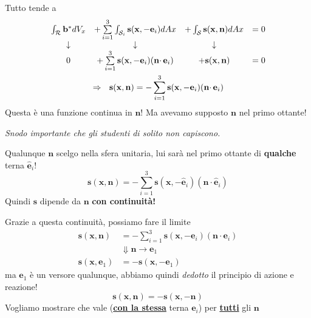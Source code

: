 \documentclass[10pt,a4paper,twoside]{book}
\begin{document}
Tutto tende a
\begin{gather*}
\begin{array}{ c c c c }
\int _{\mathcal{R}}\mathbf{b}^{*} dV_{x} & +\sum\limits ^{3}_{i=1}\int _{\mathcal{S}_{i}}\mathbf{s}(\mathbf{x} ,-\mathbf{e}_{i}) dAx & +\int _{\mathcal{S}}\mathbf{s}(\mathbf{x} ,\mathbf{n}) dAx & =0\\
\downarrow  & \downarrow  & \downarrow  & \\
0 & +\sum\limits ^{3}_{i=1}\mathbf{s}(\mathbf{x} ,-\mathbf{e}_{i})(\mathbf{n} \cdotp \mathbf{e}_{i}) & +\mathbf{s}(\mathbf{x} ,\mathbf{n}) & =0
\end{array}\\
\Rightarrow \ \ \mathbf{s}(\mathbf{x} ,\mathbf{n}) =-\sum\limits ^{3}_{i=1}\mathbf{s}(\mathbf{x} ,-\mathbf{e}_{i})(\mathbf{n} \cdotp \mathbf{e}_{i})
\end{gather*}
Questa è una funzione continua in $\mathbf{n}$! Ma avevamo supposto $\mathbf{n}$ nel primo ottante!



\textit{Snodo importante che gli studenti di solito non capiscono.}

Qualunque $\mathbf{n}$ scelgo nella sfera unitaria, lui sarà nel primo ottante di \textbf{qualche} terna $\hat{\mathbf{e}}_{i}$!
\begin{equation*}
\mathbf{s}(\mathbf{x} ,\mathbf{n}) =-\sum\limits ^{3}_{i=1}\mathbf{s}(\mathbf{x} ,-\hat{\mathbf{e}}_{i})(\mathbf{n} \cdotp \hat{\mathbf{e}}_{i})
\end{equation*}
Quindi $\mathbf{s}$ dipende da $\mathbf{n}$ \textbf{con continuità!}

Grazie a questa continuità, possiamo fare il limite
\begin{equation*}
\begin{aligned}
\mathbf{s}(\mathbf{x} ,\mathbf{n}) & =-\sum\limits ^{3}_{i=1}\mathbf{s}(\mathbf{x} ,-\mathbf{e}_{i})(\mathbf{n} \cdotp \mathbf{e}_{i})\\
 & \Downarrow \mathbf{n}\rightarrow \mathbf{e}_{1}\\
\mathbf{s}(\mathbf{x} ,\mathbf{e}_{1}) & =-\mathbf{s}(\mathbf{x} ,-\mathbf{e}_{1})
\end{aligned}
\end{equation*}
ma $\mathbf{e}_{1}$ è un versore qualunque, abbiamo quindi \textit{dedotto} il principio di azione e reazione!
\begin{equation*}
\boxed{\mathbf{s}(\mathbf{x} ,\mathbf{n}) =-\mathbf{s}(\mathbf{x} ,-\mathbf{n})}
\end{equation*}
Vogliamo mostrare che vale (\underline{\textbf{con la stessa}} terna $\mathbf{e}_{i}$) per \underline{\textbf{tutti}} gli $\mathbf{n}$
\end{document}

